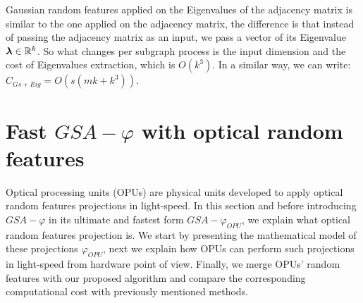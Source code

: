 Gaussian random features applied on the Eigenvalues of the adjacency matrix is similar to the one applied on the adjacency matrix, the difference is that instead of passing the adjacency matrix as an input, we pass a vector of its Eigenvalue $\boldsymbol{\lambda}\in\mathbb{R}^k$. So what changes per subgraph process is the input dimension and the cost of Eigenvalues extraction, which is $O(k^3)$. In a similar way, we can write: $C_{Gs+Eig}=O(s(mk+k^3))$.



\section{Fast $GSA-\varphi$ with optical random features}
\label{section:OPU}
Optical processing units (OPUs) are physical units developed to apply optical random features projections in light-speed. In this section and before introducing $GSA-\varphi$ in its ultimate and fastest form $GSA-\varphi_{OPU}$, we explain what optical random features projection is. We start by presenting the mathematical model of these projections $\varphi_{OPU}$, next we explain how OPUs can perform such projections in light-speed from hardware point of view. Finally, we merge OPUs' random features with our proposed algorithm and compare the corresponding computational cost with previously mentioned methods.

